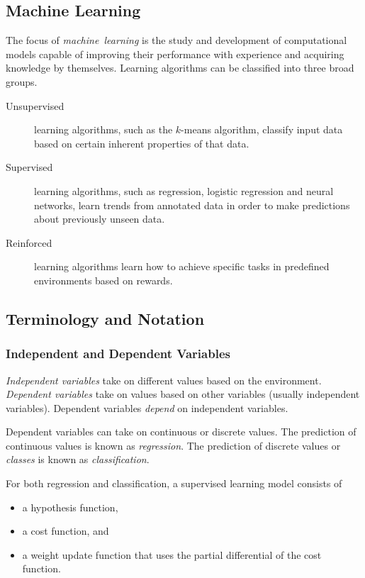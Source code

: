\subsection{Machine Learning}

The focus of \emph{machine~learning} is the study and development of computational models capable of improving their performance with experience and acquiring knowledge by themselves.
Learning algorithms can be classified into three broad groups.
\begin{description}
  \item[Unsupervised] learning algorithms, such as the \( k \)-means algorithm, classify input data based on certain inherent properties of that data.
  \item[Supervised] learning algorithms, such as regression, logistic regression and neural networks, learn trends from annotated data in order to make predictions about previously unseen data.
  \item[Reinforced] learning algorithms learn how to achieve specific tasks in predefined environments based on rewards.
\end{description}

\subsection{Terminology and Notation}

\subsubsection{Independent and Dependent Variables}

\emph{Independent variables} take on different values based on the environment.
\emph{Dependent variables} take on values based on other variables (usually independent variables).
Dependent variables \emph{depend} on independent variables.

Dependent variables can take on continuous or discrete values.
The prediction of continuous values is known as \emph{regression}.
The prediction of discrete values or \emph{classes} is known as \emph{classification}.

For both regression and classification, a supervised learning model consists of
\begin{itemize}
  \item a hypothesis function,
  \item a cost function, and
  \item a weight update function that uses the partial differential of the cost function.
\end{itemize}

